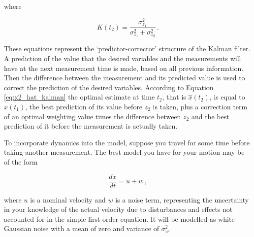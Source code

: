 \noindent
where

\begin{equation}\label{}
  K(t_2) = \frac{\sigma^2_{z_1}}{\sigma^2_{z_1}+\sigma^2_{z_2}}\,.
\end{equation}

\noindent
These equations represent the `predictor-corrector' structure of the Kalman filter. A prediction of the value that the desired variables and the measurements will have at the next measurement time is made, based on all previous information. Then the difference between the measurement and its predicted value is used to correct the prediction of the desired variables. According to Equation \ref{eq:x2_hat_kalman} the optimal estimate at time $t_2$, that is $\hat{x}(t_2)$, is equal to $\hat{x}(t_1)$, the best prediction of its value before $z_2$ is taken, plus a correction term of an optimal weighting value times the difference between $z_2$ and the best prediction of it before the measurement is actually taken.

To incorporate dynamics into the model, suppose you travel for some time before taking another measurement. The best model you have for your motion may be of the form

\begin{equation}\label{}
  \frac{dx}{dt} = u + w\,,
\end{equation}

\noindent
where $u$ is a nominal velocity and $w$ is a noise term, representing the uncertainty in your knowledge of the actual velocity due to disturbances and effects not accounted for in the simple first order equation. It will be modelled as white Gaussian noise with a mean of zero and variance of $\sigma^2_w$.

